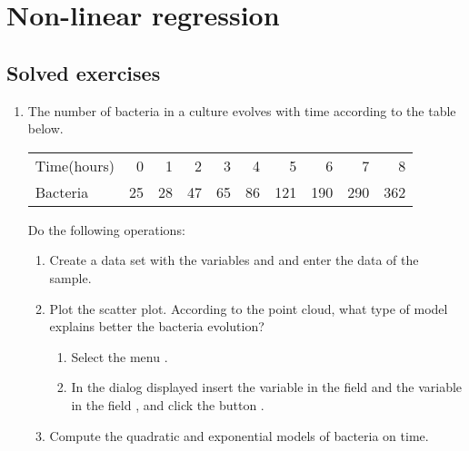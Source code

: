 
\chapter{Non-linear regression}\label{cha:non-linear-regression}

\section{Solved exercises}
\begin{enumerate}[leftmargin=*]
\item The number of bacteria in a culture evolves with time according to the table below.

\begin{center}
\begin{tabular}{lrrrrrrrrr}
\hline
Time(hours) & 0 & 1 & 2 & 3 & 4 & 5 & 6 & 7 & 8  \\
Bacteria & 25 & 28 & 47 & 65 & 86 & 121 & 190 & 290 & 362\\
\hline
\end{tabular}
\end{center}

Do the following operations:
\begin{enumerate}
\item Create a data set with the variables  and  and enter the data of the sample.

\item Plot the scatter plot. 
According to the point cloud, what type of model explains better the bacteria evolution?
\begin{indication}
\begin{enumerate}
\item Select the menu .
\item In the dialog displayed insert the variable  in the field 
and the variable  in the field , and click the button .
\end{enumerate}
\end{indication}

\item Compute the quadratic and exponential models of bacteria on time.


\end{enumerate}
\end{enumerate}
